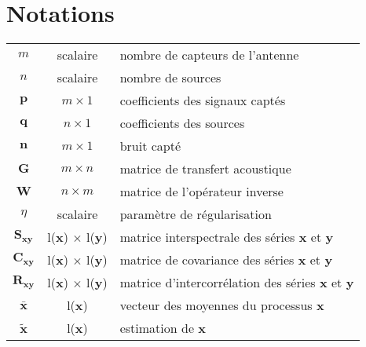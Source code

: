 \documentclass[twocolumn, 11pt]{article}
\begin{document}
\newpage
\section*{Notations}

\begin{center}
	
	\begin{tabularx}{0.5\textwidth}{c c X}
		$m$			&	scalaire		&	nombre de capteurs de l'antenne\\
		$n$			&	scalaire		&	nombre de sources\\
	    $\bm{p}$		& $m\times 1$	&	coefficients des signaux captés\\
	    $\bm{q}$		& $n \times 1$	& 	coefficients des sources\\
	    $\bm{n}$		& $m\times 1$	&	bruit capté\\
		$\bm{G}$		& $m\times n$	&	matrice de transfert acoustique\\
		$\bm{W}$		&	$n\times m$	&	matrice de l'opérateur inverse\\
		$\eta$		& scalaire		&	paramètre de régularisation\\
		$\bm{S_{xy}}$& l($\bm{x}$) $\times$ l($\bm{y}$) & matrice interspectrale des séries $\bm{x}$ et $\bm{y}$\\
		$\bm{C_{xy}}$&	l($\bm{x}$) $\times$ l($\bm{y}$) & matrice de covariance des séries $\bm{x}$ et $\bm{y}$\\
		$\bm{R_{xy}}$&	l($\bm{x}$) $\times$ l($\bm{y}$) & matrice d'intercorrélation des séries $\bm{x}$ et $\bm{y}$\\
		$\bm{\bar{x}}$	& l($\bm{x}$)	& vecteur des moyennes du processus $\bm{x}$\\
		$\bm{\tilde{x}}$	& l($\bm{x}$)	& estimation de $\bm{x}$
		
	\end{tabularx}
\end{center}


\newpage  	

\newpage
\tableofcontents
\newpage


%

\end{document}
